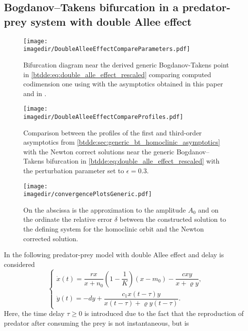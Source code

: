 \subsection{Bogdanov--Takens bifurcation in a predator-prey system with double Allee effect}
\label{btdde:sec:example:predator_prey}
\begin{figure}[ht!]
    \centering
    \texttt{[image: \\imagedir/DoubleAlleeEffectCompareParameters.pdf]}
    \caption{Bifurcation diagram near the derived generic Bogdanov-Takens point in
        \cref{btdde:eq:double_alle_effect_rescaled} comparing computed codimension one
        using \DDEBIFTOOL with the asymptotics obtained in this paper and in \cite{Jiao2021}.}
    \label{btdde:fig:DoubleAlleeEffectCompareParameters}
\end{figure}
\begin{figure}[ht!]
    \centering
    \texttt{[image: \\imagedir/DoubleAlleeEffectCompareProfiles.pdf]}
    \caption{Comparison between the profiles of the first and third-order asymptotics from
    \cref{btdde:sec:generic_bt_homoclinic_asymptotics} with the Newton correct solutions near the generic
        Bogdanov--Takens bifurcation in \cref{btdde:eq:double_alle_effect_rescaled} with the
        perturbation parameter set to $\epsilon=0.3$.}
    \label{btdde:fig:DoubleAlleeEffectCompareProfiles}
\end{figure}
%
\begin{figure}[ht]
    \texttt{[image: \\imagedir/convergencePlotsGeneric.pdf]}
    \caption{On the abscissa is the approximation to the amplitude $A_0$ and on
        the ordinate the relative error $\delta$ between the constructed
        solution to the defining system
        \cite{connecting@2002} for the homoclinic orbit and the Newton
        corrected solution.}
    \label{btdde:fig:convergencePlotsGeneric}
\end{figure}
%
In \cite{Jiao2021} the following predator-prey model with double Allee effect and delay is considered
\begin{equation}
\label{btdde:eq:double_alle_effect}
\begin{cases}
    \dot x(t) = \dfrac{rx}{x+n_0}\left(1-\dfrac1 K\right)\left(x - m_0\right) - \dfrac{cxy}{x+\varrho y},\\
    \dot y(t) = -dy + \dfrac{c_1 x(t-\tau)y}{x(t-\tau) + \varrho y(t-\tau)}.
\end{cases}
\end{equation}
Here, the time delay $\tau \geq 0$ is introduced due to the fact that the
reproduction of predator after consuming the prey is not instantaneous, but is
